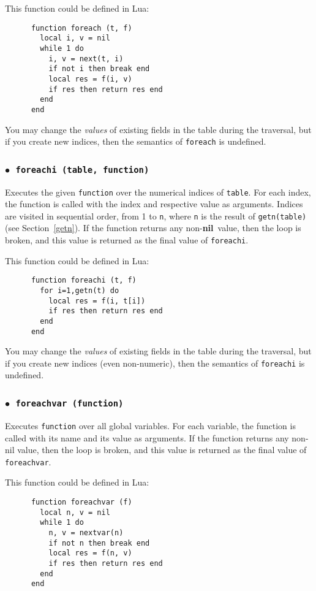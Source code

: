 \documentclass[11pt]{article}
\newcommand{\See}[1]{Section~\ref{#1}}
\newcommand{\see}[1]{(see \See{#1})}
\newcommand{\T}[1]{{\tt #1}}
\newcommand{\nil}{{\bf nil}}
\newcommand{\Deffunc}[1]{\index{#1}}
\newcommand{\ff}{$\bullet$\ }
\begin{document}
This function could be defined in Lua:
\begin{verbatim}
      function foreach (t, f)
        local i, v = nil
        while 1 do
          i, v = next(t, i)
          if not i then break end
          local res = f(i, v)
          if res then return res end
        end
      end
\end{verbatim}

You may change the \emph{values} of existing fields in the table during the traversal,
but
if you create new indices,
then
the semantics of \verb|foreach| is undefined.


\subsubsection*{\ff \T{foreachi (table, function)}}\Deffunc{foreachi}
Executes the given \verb|function| over the
numerical indices of \verb|table|.
For each index, the function is called with the index and
respective value as arguments.
Indices are visited in sequential order,
from 1 to \verb|n|,
where \verb|n| is the result of \verb|getn(table)| \see{getn}.
If the function returns any non-\nil\ value,
then the loop is broken, and this value is returned
as the final value of \verb|foreachi|.

This function could be defined in Lua:
\begin{verbatim}
      function foreachi (t, f)
        for i=1,getn(t) do
          local res = f(i, t[i])
          if res then return res end
        end
      end
\end{verbatim}

You may change the \emph{values} of existing fields in the table during the traversal,
but
if you create new indices (even non-numeric),
then
the semantics of \verb|foreachi| is undefined.

\subsubsection*{\ff \T{foreachvar (function)}}\Deffunc{foreachvar}
Executes \verb|function| over all global variables.
For each variable,
the function is called with its name and its value as arguments.
If the function returns any non-nil value,
then the loop is broken, and this value is returned
as the final value of \verb|foreachvar|.

This function could be defined in Lua:
\begin{verbatim}
      function foreachvar (f)
        local n, v = nil
        while 1 do
          n, v = nextvar(n)
          if not n then break end
          local res = f(n, v)
          if res then return res end
        end
      end
\end{verbatim}
\end{document}
